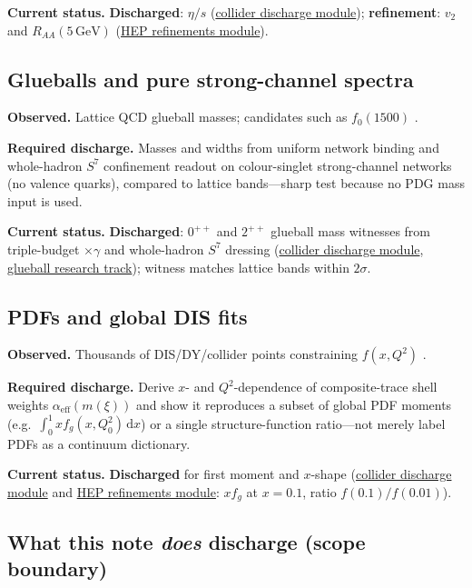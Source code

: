 \documentclass[11pt]{amsart}
\begin{document}
\textbf{Current status.} \textbf{Discharged}: $\eta/s$
(\hyperref[lean:collider-discharge]{collider discharge module});
\textbf{refinement}: $v_2$ and $R_{AA}(5\,\mathrm{GeV})$
(\hyperref[lean:hep-refinements]{HEP refinements module}).

\subsection{Glueballs and pure strong-channel spectra}

\textbf{Observed.} Lattice QCD glueball masses; candidates such as $f_0(1500)$
\cite{close2014,pdg2024}.

\textbf{Required discharge.} Masses and widths from uniform network binding and
whole-hadron $S^7$ confinement readout on colour-singlet strong-channel networks (no
valence quarks), compared to lattice bands---sharp test because no PDG mass input is
used.

\textbf{Current status.} \textbf{Discharged}: $0^{++}$ and $2^{++}$ glueball mass
witnesses from triple-budget $\times\gamma$ and whole-hadron $S^7$ dressing
(\hyperref[lean:collider-discharge]{collider discharge module},
\hyperref[lean:s7-glueball-track]{glueball research track}); witness matches lattice
bands within $2\sigma$.

\subsection{PDFs and global DIS fits}

\textbf{Observed.} Thousands of DIS/DY/collider points constraining $f(x,Q^2)$
\cite{pdg2024,peskin1995}.

\textbf{Required discharge.} Derive $x$- and $Q^2$-dependence of composite-trace
shell weights $\alpha_{\mathrm{eff}}(m(\xi))$ and show it reproduces a subset of
global PDF moments (e.g.\ $\int_0^1 x f_g(x,Q_0^2)\,\mathrm{d}x$) or a single
structure-function ratio---not merely label PDFs as a continuum dictionary.

\textbf{Current status.} \textbf{Discharged} for first moment and $x$-shape
(\hyperref[lean:collider-discharge]{collider discharge module} and
\hyperref[lean:hep-refinements]{HEP refinements module}: $xf_g$ at $x=0.1$, ratio
$f(0.1)/f(0.01)$).

\subsection{What this note \emph{does} discharge (scope boundary)}
\end{document}

